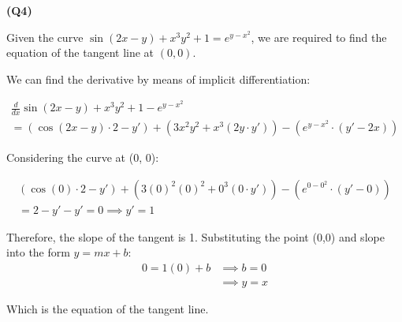 \documentclass[12pt, a4paper]{article}
\newcommand{\ddx}{\frac{d}{dx}}
\begin{document}
\textbf{(Q4)} 

Given the curve $\sin (2x - y) + x^3y^2 + 1 = e^{y - x^2}$, we are required to find
the equation of the tangent line at $(0,0)$.

We can find the derivative by means of implicit differentiation:

\begin{gather*}
    \ddx \sin (2x - y) + x^3y^2 + 1 - e^{y - x^2}\\
    = (\cos(2x-y) \cdot 2 - y') + (3x^2y^2 + x^3(2y \cdot y')) - (e^{y-x^2} \cdot (y' - 2x))
\end{gather*}

Considering the curve at (0, 0):

\begin{gather*}
    (\cos(0) \cdot 2 - y') + (3(0)^2(0)^2 + 0^3(0 \cdot y')) - (e^{0-0^2} \cdot (y' - 0))\\
    = 2 - y' - y' = 0 \implies y' = 1
\end{gather*}

Therefore, the slope of the tangent is 1. Substituting the point (0,0) and slope into the 
form $y = mx + b$:
\begin{align*}
    0 = 1(0) + b & \implies b = 0\\
    & \implies y = x
\end{align*}

Which is the equation of the tangent line.
\end{document}
